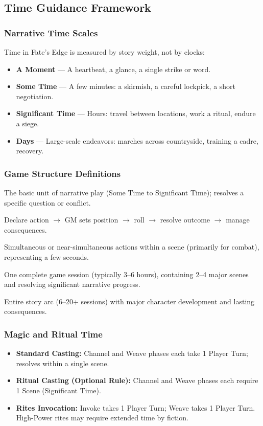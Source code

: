 \subsection{Time Guidance Framework}

\subsubsection{Narrative Time Scales}
Time in Fate's Edge is measured by story weight, not by clocks:
\begin{itemize}
  \item \textbf{A Moment} — A heartbeat, a glance, a single strike or word.
  \item \textbf{Some Time} — A few minutes: a skirmish, a careful lockpick, a short negotiation.
  \item \textbf{Significant Time} — Hours: travel between locations, work a ritual, endure a siege.
  \item \textbf{Days} — Large-scale endeavors: marches across countryside, training a cadre, recovery.
\end{itemize}

\subsubsection{Game Structure Definitions}
\begin{description}[leftmargin=1.5em, labelindent=0em]
  \item[Scene] The basic unit of narrative play (Some Time to Significant Time); resolves a specific question or conflict.
  \item[Player Turn (Beat)] Declare action $\rightarrow$ GM sets position $\rightarrow$ roll $\rightarrow$ resolve outcome $\rightarrow$ manage consequences.
  \item[Round] Simultaneous or near-simultaneous actions within a scene (primarily for combat), representing a few seconds.
  \item[Session] One complete game session (typically 3–6 hours), containing 2–4 major scenes and resolving significant narrative progress.
  \item[Campaign] Entire story arc (6–20+ sessions) with major character development and lasting consequences.
\end{description}

\subsubsection{Magic and Ritual Time}
\begin{itemize}
  \item \textbf{Standard Casting:} Channel and Weave phases each take 1 Player Turn; resolves within a single scene.
  \item \textbf{Ritual Casting (Optional Rule):} Channel and Weave phases each require 1 Scene (Significant Time).
  \item \textbf{Rites Invocation:} Invoke takes 1 Player Turn; Weave takes 1 Player Turn. High-Power rites may require extended time by fiction.
\end{itemize}

